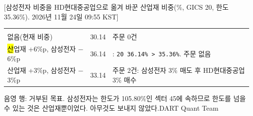 [삼성전자 비중을 HD현대중공업으로 옮겨 바꾼 산업재 비중(\%, GICS 20, 한도 35.36\%). 2026년 11월 24일 09:55 KST]{%
{\tabfont\begin{tabularx}{\linewidth}{>{\RaggedRight\arraybackslash}p{58mm} R{15mm} >{\RaggedRight\arraybackslash\leftskip=8pt}X}
 &  & \\
없음(현재 비중) & 30.14 & 주문 0건\\\rowsep
\hl 산업재 +6\%p, 삼성전자 $-$6\%p & 36.14 & : \texttt{20 36.14\% > 35.36\%}. 주문 없음\\\rowsep
산업재 +3\%p, 삼성전자 $-$3\%p & 33.14 & 주문 2건: 삼성전자 3\% 매도 후 HD현대중공업 3\% 매수\\
\end{tabularx}}}{음영 행: 거부된 목표. 삼성전자는 한도가 105.80\%인 섹터 45에 속하므로 한도를 넘을 수 있는 것은 산업재뿐이었다. 아무것도 보내지 않았다.}{DART Quant Team}
